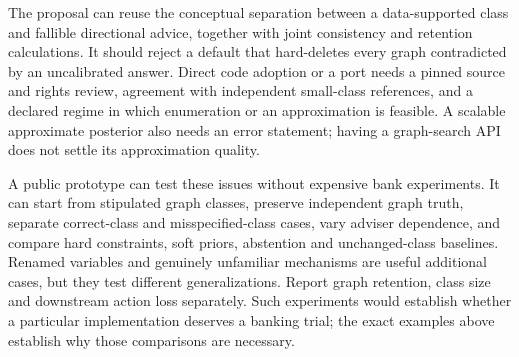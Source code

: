 The proposal can reuse the conceptual separation between a data-supported
class and fallible directional advice, together with joint consistency and
retention calculations. It should reject a default that hard-deletes every
graph contradicted by an uncalibrated answer. Direct code adoption or a port
needs a pinned source and rights review, agreement with independent small-class
references, and a declared regime in which enumeration or an approximation is
feasible. A scalable approximate posterior also needs an error statement;
having a graph-search API does not settle its approximation quality.

A public prototype can test these issues without expensive bank experiments.
It can start from stipulated graph classes, preserve independent graph truth,
separate correct-class and misspecified-class cases, vary adviser dependence,
and compare hard constraints, soft priors, abstention and unchanged-class
baselines. Renamed variables and genuinely unfamiliar mechanisms are useful
additional cases, but they test different generalizations. Report graph
retention, class size and downstream action loss separately. Such experiments
would establish whether a particular implementation deserves a banking trial;
the exact examples above establish why those comparisons are necessary.

\label{exec17:advice-development-end}
